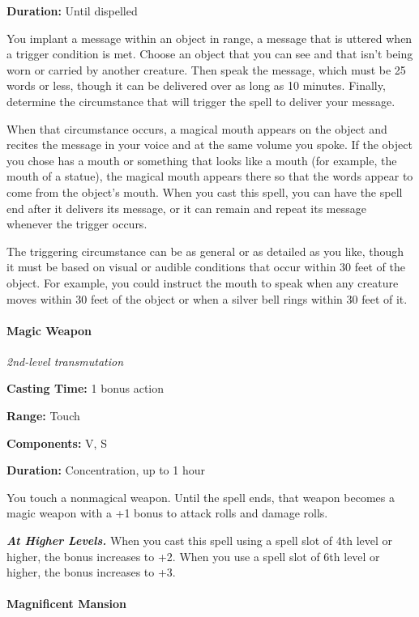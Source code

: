 \documentclass[
]{article}
\begin{document}
\textbf{Duration:} Until dispelled

You implant a message within an object in range, a message that is
uttered when a trigger condition is met. Choose an object that you can
see and that isn't being worn or carried by another creature. Then speak
the message, which must be 25 words or less, though it can be delivered
over as long as 10 minutes. Finally, determine the circumstance that
will trigger the spell to deliver your message.

When that circumstance occurs, a magical mouth appears on the object and
recites the message in your voice and at the same volume you spoke. If
the object you chose has a mouth or something that looks like a mouth
(for example, the mouth of a statue), the magical mouth appears there so
that the words appear to come from the object's mouth. When you cast
this spell, you can have the spell end after it delivers its message, or
it can remain and repeat its message whenever the trigger occurs.

The triggering circumstance can be as general or as detailed as you
like, though it must be based on visual or audible conditions that occur
within 30 feet of the object. For example, you could instruct the mouth
to speak when any creature moves within 30 feet of the object or when a
silver bell rings within 30 feet of it.

\hypertarget{magic-weapon}{%
\paragraph{Magic Weapon}\label{magic-weapon}}

\emph{2nd-level transmutation}

\textbf{Casting Time:} 1 bonus action

\textbf{Range:} Touch

\textbf{Components:} V, S

\textbf{Duration:} Concentration, up to 1 hour

You touch a nonmagical weapon. Until the spell ends, that weapon becomes
a magic weapon with a +1 bonus to attack rolls and damage rolls.

\emph{\textbf{At Higher Levels.}} When you cast this spell using a spell
slot of 4th level or higher, the bonus increases to +2. When you use a
spell slot of 6th level or higher, the bonus increases to +3.

\hypertarget{magnificent-mansion}{%
\paragraph{Magnificent Mansion}\label{magnificent-mansion}}
\end{document}
